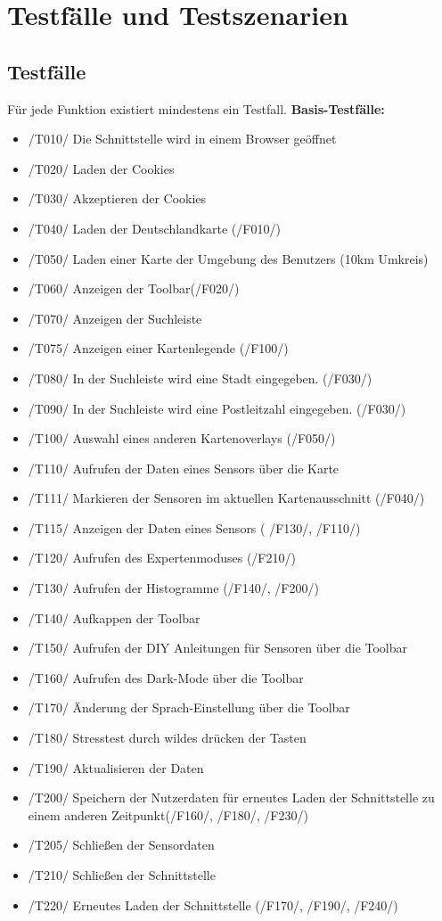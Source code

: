 \section{Testfälle und Testszenarien}
\subsection{Testfälle}

Für jede Funktion existiert mindestens ein Testfall.
\newline
\textbf{Basis-Testfälle:}
\begin{itemize}
    \item /T010/ Die Schnittstelle wird in einem Browser geöffnet 
    \item /T020/ Laden der Cookies
    \item /T030/ Akzeptieren der Cookies
    \item /T040/ Laden der Deutschlandkarte (/F010/)
    \item /T050/ Laden einer Karte der Umgebung des Benutzers (10km Umkreis)
    \item /T060/ Anzeigen der Toolbar(/F020/)
    \item /T070/ Anzeigen der Suchleiste
    \item /T075/ Anzeigen einer Kartenlegende (/F100/)
    \item /T080/ In der Suchleiste wird eine Stadt eingegeben. (/F030/)
    \item /T090/ In der Suchleiste wird eine Postleitzahl eingegeben. (/F030/)
    \item /T100/ Auswahl eines anderen Kartenoverlays (/F050/)
    \item /T110/ Aufrufen der Daten eines Sensors über die Karte
    \item /T111/ Markieren der Sensoren im aktuellen Kartenausschnitt (/F040/)
    \item /T115/ Anzeigen der Daten eines Sensors ( /F130/, /F110/)
    \item /T120/ Aufrufen des Expertenmoduses (/F210/)
    \item /T130/ Aufrufen der Histogramme (/F140/, /F200/)
    \item /T140/ Aufkappen der Toolbar
    \item /T150/ Aufrufen der DIY Anleitungen für Sensoren über die Toolbar
    \item /T160/ Aufrufen des Dark-Mode über die Toolbar
    \item /T170/ Änderung der Sprach-Einstellung über die Toolbar
    \item /T180/ Stresstest durch wildes drücken der Tasten
    \item /T190/ Aktualisieren der Daten
    \item /T200/ Speichern der Nutzerdaten für erneutes Laden der Schnittstelle zu einem anderen Zeitpunkt(/F160/, /F180/, /F230/)
    \item /T205/ Schließen der Sensordaten
    \item /T210/ Schließen der Schnittstelle
    \item /T220/ Erneutes Laden der Schnittstelle (/F170/, /F190/, /F240/)
    
\end{itemize}
